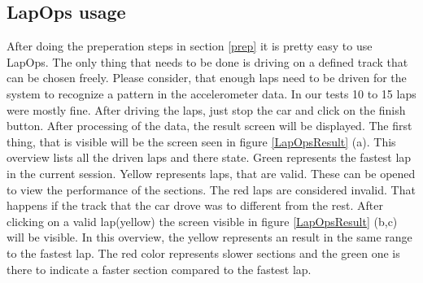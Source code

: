 \subsection{LapOps usage}
After doing the preperation steps in section \ref{prep} it is pretty easy to use LapOps. The only thing that needs to be done is driving on a defined track that can be chosen freely. Please consider, that enough laps need to be driven for the system to recognize a pattern in the accelerometer data. In our tests 10 to 15 laps were mostly fine. After driving the laps, just stop the car and click on the finish button. After processing of the data, the result screen will be displayed. The first thing, that is visible will be the screen seen in figure \ref{LapOpsResult} (a). This overview lists all the driven laps and there state. Green represents the fastest lap in the current session. Yellow represents laps, that are valid. These can be opened to view the performance of the sections. The red laps are considered invalid. That happens if the track that the car drove was to different from the rest. After clicking on a valid lap(yellow) the screen visible in figure \ref{LapOpsResult} (b,c) will be visible. In this overview, the yellow represents an result in the same range to the fastest lap. The red color represents slower sections and the green one is there to indicate a faster section compared to the fastest lap.
